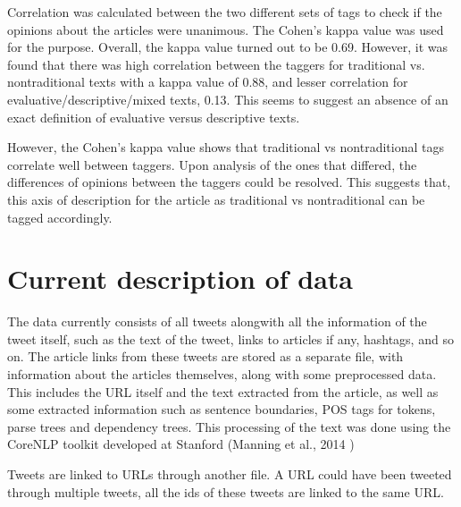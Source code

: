 Correlation was calculated between the two different sets of tags to check if the opinions about the articles were unanimous. The Cohen’s kappa value was used for the purpose. Overall, the kappa value turned out to be 0.69. However, it was found that there was high correlation between the taggers for traditional vs. nontraditional texts with a kappa value of 0.88, and lesser correlation for evaluative/descriptive/mixed texts, 0.13. This seems to suggest an absence of an exact definition of evaluative versus descriptive texts. 

However, the Cohen’s kappa value shows that traditional vs nontraditional tags correlate well between taggers. Upon analysis of the ones that differed, the differences of opinions between the taggers could be resolved. This suggests that, this axis of description for the article as traditional vs nontraditional can be tagged accordingly.

\section {Current description of data}

The data currently consists of all tweets alongwith all the information of the tweet itself, such as the text of the tweet, links to articles if any, hashtags, and so on. The article links from these tweets are stored as a separate file, with information about the articles themselves, along with some preprocessed data. This includes the URL itself and the text extracted from the article, as well as some extracted information such as sentence boundaries, POS tags for tokens, parse trees and dependency trees. This processing of the text was done using the CoreNLP toolkit developed at Stanford (Manning et al., 2014 \cite{manning2014stanford})

Tweets are linked to URLs through another file. A URL could have been tweeted through multiple tweets, all the ids of these tweets are linked to the same URL. 

